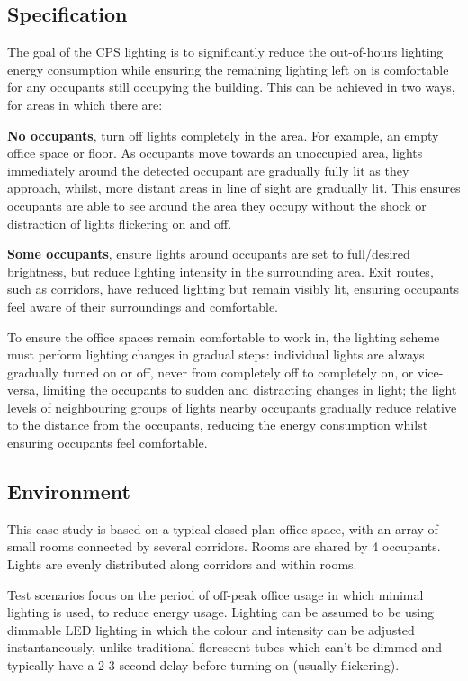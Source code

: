 \subsection{Specification} %
\label{sub:specification}
The goal of the CPS lighting is to significantly reduce the out-of-hours lighting energy consumption while ensuring the remaining lighting left on is comfortable for any occupants still occupying the building. This can be achieved in two ways, for areas in which there are:


\textbf{No occupants}, turn off lights completely in the area. For example, an empty office space or floor. As occupants move towards an unoccupied area, lights immediately around the detected occupant are gradually fully lit as they approach, whilst, more distant areas in line of sight are gradually lit. This ensures occupants are able to see around the area they occupy without the shock or distraction of lights flickering on and off.

\textbf{Some occupants}, ensure lights around occupants are set to full/desired brightness, but reduce lighting intensity in the surrounding area. Exit routes, such as corridors, have reduced lighting but remain visibly lit, ensuring occupants feel aware of their surroundings and comfortable.

To ensure the office spaces remain comfortable to work in, the lighting scheme must perform lighting changes in gradual steps: individual lights are always gradually turned on or off, never from completely off to completely on, or vice-versa, limiting the occupants to sudden and distracting changes in light; the light levels of neighbouring groups of lights nearby occupants gradually reduce relative to the distance from the occupants, reducing the energy consumption whilst ensuring occupants feel comfortable. 

\subsection{Environment}
\label{subsec:Environment}
This case study is based on a typical closed-plan office space, with an array of small rooms connected by several corridors. Rooms are shared by 4 occupants. Lights are evenly distributed along corridors and within rooms. 

Test scenarios focus on the period of off-peak office usage in which minimal lighting is used, to reduce energy usage. Lighting can be assumed to be using dimmable LED lighting in which the colour and intensity can be adjusted instantaneously, unlike traditional florescent tubes which can't be dimmed and typically have a 2-3 second delay before turning on (usually flickering). 

